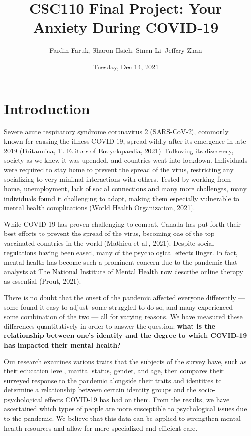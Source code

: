 \documentclass[fontsize=11pt]{article}
\title{CSC110 Final Project: Your Anxiety During COVID-19}
\author{Fardin Faruk, Sharon Hsieh, Sinan Li, Jeffery Zhan}
\date{Tuesday, Dec 14, 2021}
\begin{document}
    \maketitle

    \section*{Introduction}
    Severe acute respiratory syndrome coronavirus 2 (SARS-CoV-2), commonly known for causing the illness COVID-19, spread wildly after its emergence in late 2019 (Britannica, T. Editors of Encyclopaedia, 2021).
    Following its discovery, society as we knew it was upended, and countries went into lockdown.
    Individuals were required to stay home to prevent the spread of the virus, restricting any socializing to very minimal interactions with others.
    Tested by working from home, unemployment, lack of social connections and many more challenges, many individuals found it challenging to adapt, making them especially vulnerable to mental health complications (World Health Organization, 2021).

    While COVID-19 has proven challenging to combat, Canada has put forth their best efforts to prevent the spread of the virus, becoming one of the top vaccinated countries in the world (Mathieu et al., 2021).
    Despite social regulations having been eased, many of the psychological effects linger.
    In fact, mental health has become such a prominent concern due to the pandemic that analysts at The National Institute of Mental Health now describe online therapy as essential (Prout, 2021).

    There is no doubt that the onset of the pandemic affected everyone differently — some found it easy to adjust, some struggled to do so, and many experienced some combination of the two — all for varying reasons.
    We have measured these differences quantitatively in order to answer the question: \textbf{what is the relationship between one’s identity and the degree to which COVID-19 has impacted their mental health?}

    Our research examines various traits that the subjects of the survey have, such as their education level, marital status, gender, and age, then compares their surveyed response to the pandemic alongside their traits and identities to determine a relationship between certain identity groups and the socio-psychological effects COVID-19 has had on them.
    From the results, we have ascertained which types of people are more susceptible to psychological issues due to the pandemic.
    We believe that this data can be applied to strengthen mental health resources and allow for more specialized and efficient care.
\end{document}
